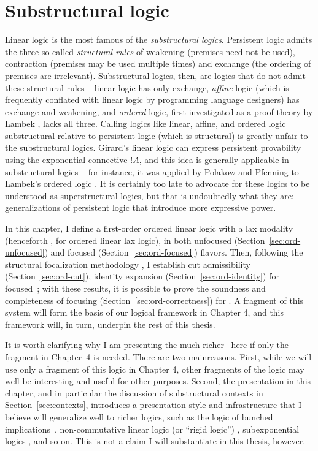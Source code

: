 \chapter{Substructural logic}

Linear logic is the most famous of the {\it substructural logics}.
Persistent logic admits the three so-called {\it structural rules} of
weakening (premises need not be used), contraction (premises may be
used multiple times) and exchange (the ordering of premises are
irrelevant). Substructural logics, then, are logics that do not admit
these structural rules -- linear logic has only exchange, {\it affine}
logic (which is frequently conflated with linear logic by programming
language designers) has exchange and weakening, and {\it ordered}
logic, first investigated as a proof theory by Lambek
\cite{lambek58mathematics}, lacks all three.  Calling logics like
linear, affine, and ordered logic \underline{sub}structural relative
to persistent logic (which is structural) is greatly unfair to the
substructural logics. Girard's linear logic can express persistent
provability using the exponential connective ${!}A$, and this idea is
generally applicable in substructural logics -- for instance, it was
applied by Polakow and Pfenning to Lambek's ordered logic
\cite{polakow99natural}. It is certainly too
late to advocate for these logics to be understood as
\underline{super}structural logics, but that is undoubtedly what they
are: generalizations of persistent logic that introduce more 
expressive power.

In this chapter, I define a first-order ordered linear logic with a
lax modality (henceforth \ollll, for ordered linear lax logic), in
both unfocused (Section~\ref{sec:ord-unfocused}) and focused
(Section~\ref{sec:ord-focused}) flavors. Then, following the
structural focalization methodology \cite{simmons11structural}, I
establish cut admissibility (Section~\ref{sec:ord-cut}), identity
expansion (Section~\ref{sec:ord-identity}) for focused~\ollll; with
these results, it is possible to prove the soundness and completeness
of focusing (Section~\ref{sec:ord-correctness}) for \ollll.  A
fragment of this system will form the basis of our logical framework
in Chapter 4, and this framework will, in turn, underpin the rest of
this thesis.

It is worth clarifying why I am presenting the much richer \ollll~here
if only the fragment in Chapter~4 is needed. There are two
mainreasons.  First, while we will use only a fragment of this logic
in Chapter 4, other fragments of the logic may well be interesting and
useful for other purposes. Second, the presentation in this chapter,
and in particular the discussion of substructural contexts in
Section~\ref{sec:contexts}, introduces a presentation style and
infrastructure that I believe will generalize well to richer logics,
such as the logic of bunched implications~\cite{pym02semantics},
non-commutative linear logic (or ``rigid logic'')
\cite{simmons09linear}, subexponential logics
\cite{nigam09algorithmic}, and so on. This is not a claim I will
substantiate in this thesis, however.  

